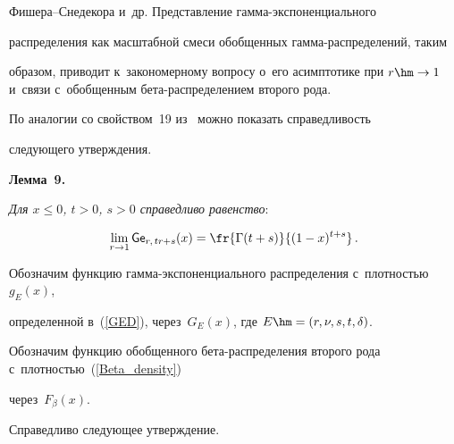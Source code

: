 Фи\-ше\-ра--Сне\-де\-ко\-ра и~др. Представление гамма-экспоненциального 


распределения как масштабной смеси обобщенных гамма-распределений, таким 


образом, приводит к~закономерному вопросу о~его асимптотике при $r\hm\to1$ и~связи с~обобщенным бе\-та-рас\-пре\-де\-ле\-ни\-ем второго рода.





По аналогии со свойством~19 из~\cite{VoKuSho2021} можно показать справедливость 


сле\-ду\-юще\-го утверж\-дения.








\smallskip





\noindent


\textbf{Лемма~9.}\




\textit{Для $x\le0$, $t>0$, $s>0$ справедливо равенство}:


$$


\lim\limits_{r\to1}{\sf Ge}_{r,\, t r + s}(x) = \fr{\Gamma(t+s)}{(1-x)^{t+s}}\,.


$$








\smallskip





Обозначим функцию гамма-экс\-по\-нен\-ци\-аль\-но\-го распределения с~плотностью $g_E (x)$, 


определенной в~(\ref{GED}), через~$G_E(x)$, где $E\hm=(r,\nu,s,t,\delta)$. 


Обозначим функцию обобщенного бе\-та-рас\-пре\-де\-ле\-ния второго рода с~плот\-ностью~(\ref{Beta_density}) 


через~$F_\beta(x)$.





Справедливо сле\-ду\-ющее утверж\-де\-ние.





\smallskip





